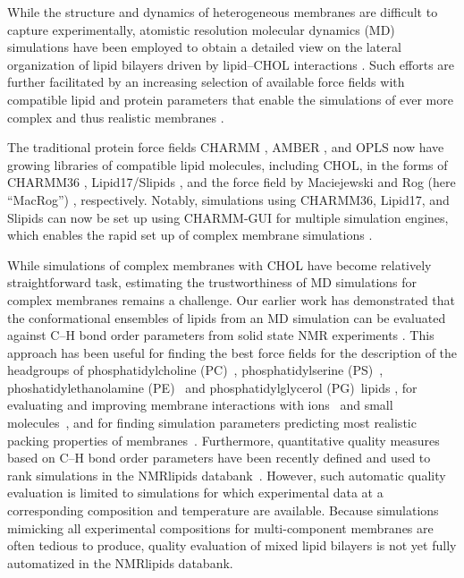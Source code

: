 \documentclass[journal=jctcce]{achemso}
\begin{document}
While the structure and dynamics of heterogeneous membranes are difficult to capture experimentally, atomistic resolution molecular dynamics (MD) simulations have been employed to obtain a detailed view on the lateral organization of lipid bilayers driven by lipid--CHOL interactions \cite{rog14,rog2009ordering,berkowitz2009detailed,enkavi2019multiscale,marrink2019computational}. Such efforts are further facilitated by an increasing selection of available force fields with compatible lipid and protein parameters that enable the simulations of ever more complex and thus realistic membranes \cite{lorent2020plasma}. 

The traditional protein force fields CHARMM \cite{brooks1983charmm}, AMBER \cite{cornell1995second}, and OPLS \cite{jorgensen1988opls,harder2016opls3} now have growing libraries of compatible lipid molecules, including CHOL, in the forms of CHARMM36 \cite{Klauda06,lim12}, Lipid17/Slipids \cite{dickson14,madej15,jambeck12,jambeck12b,jambeck13b,grote2020optimization}, and the force field by Maciejewski and Rog (here ``MacRog'') \cite{maciejewski14,kulig14,kulig15,Kulig16}, respectively. Notably, simulations using CHARMM36, Lipid17, and Slipids can now be set up using CHARMM-GUI for multiple simulation engines, which enables the rapid set up of complex membrane simulations \cite{lee16,lee2020charmm}. 

While simulations of complex membranes with CHOL have become relatively straightforward task, estimating the trustworthiness of MD simulations for complex membranes remains a challenge. Our earlier work has demonstrated that the conformational ensembles of lipids from an MD simulation can be evaluated against C--H bond order parameters from solid state NMR experiments \cite{botan15,ollila16,catte2016molecular,antila2019headgroup,bacle2021inverse}. This approach has been useful for finding the best force fields for the description of the headgroups of phosphatidylcholine (PC)~\cite{botan15}, phosphatidylserine (PS)~\cite{antila2019headgroup}, phoshatidylethanolamine (PE)~\cite{bacle2021inverse} and phosphatidylglycerol (PG)~lipids \cite{bacle2021inverse}, for evaluating and improving membrane interactions with ions~\cite{catte2016molecular,antila2019headgroup,bacle2021inverse,melcr18,melcr19} and small molecules~\cite{nencini22}, and for finding simulation parameters predicting most realistic packing properties of membranes~\cite{antila2022emerging,NMRlipidsDatabank}. Furthermore, quantitative quality measures based on C--H bond order parameters have been recently defined and used to rank simulations in the NMRlipids databank~\cite{NMRlipidsDatabank}. However, such automatic quality evaluation is limited to simulations for which experimental data at a corresponding composition and temperature are available. Because simulations mimicking all experimental compositions for multi-component membranes are often tedious to produce, quality evaluation of mixed lipid bilayers is not yet fully automatized in the NMRlipids databank. 
\end{document}
